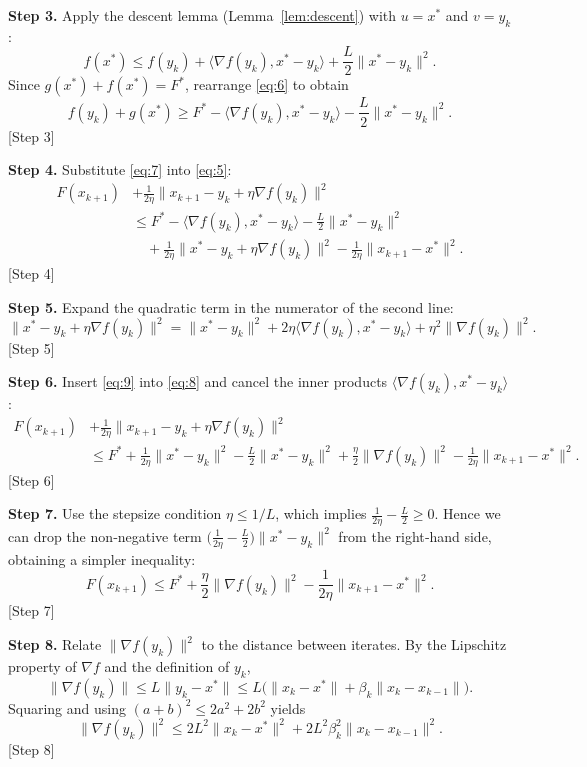 \documentclass{article}
\begin{document}
\noindent\textbf{Step 3.} Apply the descent lemma (Lemma~\ref{lem:descent}) with
$u=x^{*}$ and $v=y_k$:
\[
f(x^{*})\le f(y_k)+\langle\nabla f(y_k),x^{*}-y_k\rangle+\frac{L}{2}\|x^{*}-y_k\|^{2}.
\tag{6}
\]
Since $g(x^{*})+f(x^{*})=F^{*}$, rearrange \eqref{eq:6} to obtain
\[
f(y_k)+g(x^{*})\ge F^{*}-\langle\nabla f(y_k),x^{*}-y_k\rangle-\frac{L}{2}\|x^{*}-y_k\|^{2}. \tag{7}
\]
[Step 3]

\noindent\textbf{Step 4.} Substitute \eqref{eq:7} into \eqref{eq:5}:
\[
\begin{aligned}
F(x_{k+1})&+\frac{1}{2\eta}\|x_{k+1}-y_k+\eta\nabla f(y_k)\|^{2}\\
&\le F^{*}
-\langle\nabla f(y_k),x^{*}-y_k\rangle-\frac{L}{2}\|x^{*}-y_k\|^{2}\\
&\quad+\frac{1}{2\eta}\|x^{*}-y_k+\eta\nabla f(y_k)\|^{2}
-\frac{1}{2\eta}\|x_{k+1}-x^{*}\|^{2}. \tag{8}
\end{aligned}
\]
[Step 4]

\noindent\textbf{Step 5.} Expand the quadratic term in the numerator of the
second line:
\[
\|x^{*}-y_k+\eta\nabla f(y_k)\|^{2}
=\|x^{*}-y_k\|^{2}+2\eta\langle\nabla f(y_k),x^{*}-y_k\rangle+\eta^{2}\|\nabla f(y_k)\|^{2}.
\tag{9}
\]
[Step 5]

\noindent\textbf{Step 6.} Insert \eqref{eq:9} into \eqref{eq:8} and cancel the
inner products $ \langle\nabla f(y_k),x^{*}-y_k\rangle$:
\[
\begin{aligned}
F(x_{k+1})&+\frac{1}{2\eta}\|x_{k+1}-y_k+\eta\nabla f(y_k)\|^{2}\\
&\le F^{*}
+\frac{1}{2\eta}\|x^{*}-y_k\|^{2}
-\frac{L}{2}\|x^{*}-y_k\|^{2}
+\frac{\eta}{2}\|\nabla f(y_k)\|^{2}
-\frac{1}{2\eta}\|x_{k+1}-x^{*}\|^{2}. \tag{10}
\end{aligned}
\]
[Step 6]

\noindent\textbf{Step 7.} Use the stepsize condition $\eta\le 1/L$, which implies
$\frac{1}{2\eta}-\frac{L}{2}\ge0$. Hence we can drop the non‑negative term
$\bigl(\frac{1}{2\eta}-\frac{L}{2}\bigr)\|x^{*}-y_k\|^{2}$ from the right‑hand side,
obtaining a simpler inequality:
\[
F(x_{k+1})\le F^{*}
+\frac{\eta}{2}\|\nabla f(y_k)\|^{2}
-\frac{1}{2\eta}\|x_{k+1}-x^{*}\|^{2}. \tag{11}
\]
[Step 7]

\noindent\textbf{Step 8.} Relate $\|\nabla f(y_k)\|^{2}$ to the distance between
iterates. By the Lipschitz property of $\nabla f$ and the definition of $y_k$,
\[
\|\nabla f(y_k)\|\le L\|y_k-x^{*}\|\le L\bigl(\|x_k-x^{*}\|+\beta_k\|x_k-x_{k-1}\|\bigr). \tag{12}
\]
Squaring and using $(a+b)^{2}\le2a^{2}+2b^{2}$ yields
\[
\|\nabla f(y_k)\|^{2}\le 2L^{2}\|x_k-x^{*}\|^{2}+2L^{2}\beta_k^{2}\|x_k-x_{k-1}\|^{2}. \tag{13}
\]
[Step 8]
\end{document}
